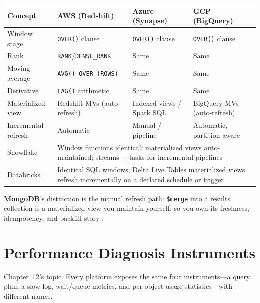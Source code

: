 \begin{center}
\footnotesize
\begin{tabular}{@{}p{2.9cm}p{3.0cm}p{3.0cm}p{3.0cm}@{}}
\toprule
\textbf{Concept} & \textbf{AWS (Redshift)} & \textbf{Azure (Synapse)} & \textbf{GCP (BigQuery)} \\
\midrule
Window stage & \texttt{OVER()} clause & \texttt{OVER()} clause & \texttt{OVER()} clause \\
Rank & \texttt{RANK}/\texttt{DENSE\_RANK} & Same & Same \\
Moving average & \texttt{AVG() OVER (ROWS)} & Same & Same \\
Derivative & \texttt{LAG()} arithmetic & Same & Same \\
Materialized view & Redshift MVs (auto-refresh) & Indexed views / Spark SQL & BigQuery MVs (auto-refresh) \\
Incremental refresh & Automatic & Manual / pipeline & Automatic, partition-aware \\
\addlinespace
Snowflake & \multicolumn{3}{l}{Window functions identical; materialized views auto-maintained; streams + tasks for incremental pipelines} \\
Databricks & \multicolumn{3}{l}{Identical SQL windows; Delta Live Tables materialized views refresh incrementally on a declared schedule or trigger} \\
\bottomrule
\end{tabular}
\end{center}

\noindent \textbf{MongoDB}'s distinction is the manual refresh path: \texttt{\$merge} into a
results collection is a materialized view you maintain yourself, so you own its freshness,
idempotency, and backfill story \cite{mongodbSetWindowFieldsDocs,mongodbMergeDocs}.

\section{Performance Diagnosis Instruments}
%
Chapter~12's topic. Every platform exposes the same four instruments---a query plan, a slow log,
wait/queue metrics, and per-object usage statistics---with different names.

